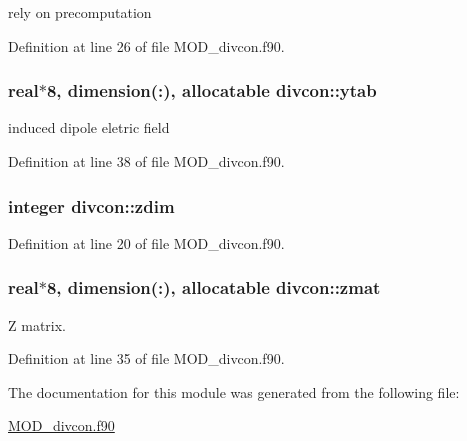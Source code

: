 rely on precomputation 



Definition at line 26 of file M\-O\-D\-\_\-divcon.\-f90.

\hypertarget{classdivcon_a1ba68250378b2f3d3274028c30a0c365}{
\subsubsection[{ytab}]{\setlength{\rightskip}{0pt plus 5cm}real$\ast$8, dimension(\-:), allocatable divcon\-::ytab}}\label{classdivcon_a1ba68250378b2f3d3274028c30a0c365}


induced dipole eletric field 



Definition at line 38 of file M\-O\-D\-\_\-divcon.\-f90.

\hypertarget{classdivcon_a6e44fc423e7b02b063c883e0e4f964ff}{
\subsubsection[{zdim}]{\setlength{\rightskip}{0pt plus 5cm}integer divcon\-::zdim}}\label{classdivcon_a6e44fc423e7b02b063c883e0e4f964ff}


Definition at line 20 of file M\-O\-D\-\_\-divcon.\-f90.

\hypertarget{classdivcon_a938a321986541d17214d4e59cab4ea34}{
\subsubsection[{zmat}]{\setlength{\rightskip}{0pt plus 5cm}real$\ast$8, dimension(\-:), allocatable divcon\-::zmat}}\label{classdivcon_a938a321986541d17214d4e59cab4ea34}


Z matrix. 



Definition at line 35 of file M\-O\-D\-\_\-divcon.\-f90.



The documentation for this module was generated from the following file\-:\begin{DoxyCompactItemize}
\item 
\hyperlink{MOD__divcon_8f90}{M\-O\-D\-\_\-divcon.\-f90}\end{DoxyCompactItemize}
